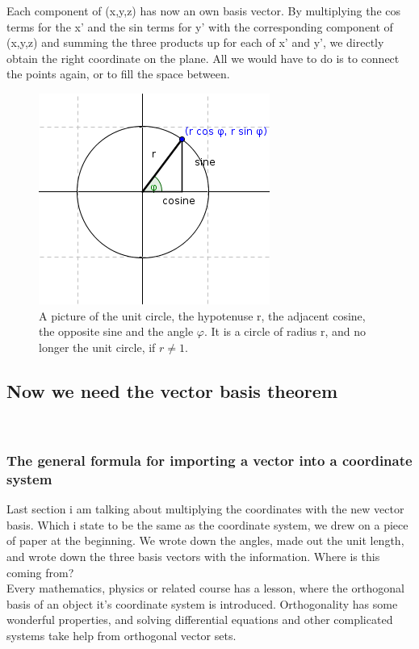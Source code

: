 \documentclass[a4paper]{article}
\begin{document}
Each component of (x,y,z) has now an own basis vector. By multiplying the cos terms for the x' and the sin terms for y' with the corresponding component of (x,y,z) and summing the three products up for each of x' and y', we directly obtain the right coordinate on the plane. All we would have to do is to connect the points again, or to fill the space between. \\

\begin{figure}[ht]
\includegraphics[scale=2]{unitcircle.png}
\caption{A picture of the unit circle, the hypotenuse r, the adjacent cosine, the opposite sine and the angle $\varphi$. It is a circle of radius r, and no longer the unit circle, if $r \neq 1$.}
\end{figure}


\subsection{Now we need the vector basis theorem}\\

\subsubsection{The general formula for importing a vector into a coordinate system}

Last section i am talking about multiplying the coordinates with the new vector basis. Which i state to be the same as the coordinate system, we drew on a piece of paper at the beginning. We wrote down the angles, made out the unit length, and wrote down the three basis vectors with the information. Where is this coming from?\\

Every mathematics, physics or related course has a lesson, where the orthogonal basis of an object it's coordinate system is introduced. Orthogonality has some wonderful properties, and solving differential equations and other complicated systems take help from orthogonal vector sets.\\
\end{document}
